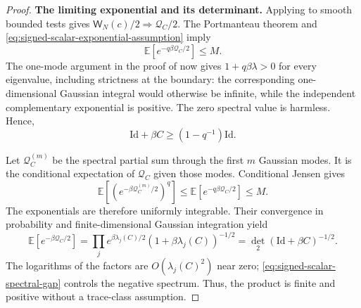 \documentclass[11pt,reqno]{amsart}
\numberwithin{equation}{section}
\theoremstyle{plain}
\theoremstyle{remark}
\newcommand{\E}{{\mathbb{E}}}
\newcommand{\be}{\beta}
\newcommand{\detTwo}{\operatorname{det}_2}
\newcommand{\step}[1]{\par\medskip\noindent\textbf{#1}}
\begin{document}
\begin{proof}
\step{The limiting exponential and its determinant.}
Applying  to smooth bounded tests gives
$\mathsf W_N(c)/2\Longrightarrow\mathcal Q_C/2$.
The Portmanteau theorem and
\eqref{eq:signed-scalar-exponential-assumption} imply
\begin{equation}\label{eq:signed-Gaussian-exponential-moment}
 \E\left[e^{-q\be\mathcal Q_C/2}\right]\leq M.
\end{equation}
The one-mode argument in the proof of
 now gives
$1+q\be\lambda>0$ for every eigenvalue, including strictness at the boundary:
the corresponding one-dimensional Gaussian integral would otherwise be
infinite, while the independent complementary exponential is positive.
The zero spectral value is harmless.  Hence,
\begin{equation}\label{eq:signed-scalar-spectral-gap}
 \mathrm{Id}+\be C\geq(1-q^{-1})\mathrm{Id}.
\end{equation}

Let $\mathcal Q_C^{(m)}$ be the spectral partial sum through the first $m$
Gaussian modes.  It is the conditional expectation of $\mathcal Q_C$ given
those modes.  Conditional Jensen gives
\begin{equation}\label{eq:signed-spectral-uniform-integrability}
 \E\left[\left(e^{-\be\mathcal Q_C^{(m)}/2}\right)^q\right]
 \leq\E\left[e^{-q\be\mathcal Q_C/2}\right]\leq M.
\end{equation}
The exponentials are therefore uniformly integrable.  Their convergence
in probability and finite-dimensional Gaussian integration yield
\begin{equation}\label{eq:signed-Gaussian-determinant}
 \E\left[e^{-\be\mathcal Q_C/2}\right]
 =\prod_j e^{\be\lambda_j(C)/2}(1+\be\lambda_j(C))^{-1/2}
 =\detTwo(\mathrm{Id}+\be C)^{-1/2}.
\end{equation}
The logarithms of the factors are $O(\lambda_j(C)^2)$ near zero;
\eqref{eq:signed-scalar-spectral-gap} controls the negative spectrum.
Thus, the product is finite and positive without a trace-class assumption.


\end{proof}
\end{document}
